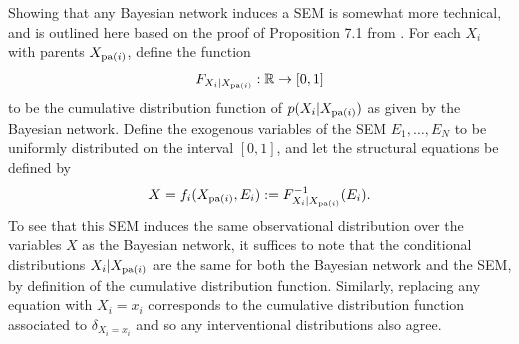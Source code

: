 Showing that any Bayesian network induces a SEM is somewhat more technical, and is outlined here based on the proof of Proposition 7.1 from \cite{peters2017elements}. 
For each $X_i$ with parents $X_{\operatorname{pa}(i)}$, define the function
%
\begin{align*}
F_{X_i|X_{\operatorname{pa}(i)}}:\mathbb{R} \to [0,1]
\end{align*}
%
to be the cumulative distribution function of $p(X_i|X_{\operatorname{pa}(i)})$ as given by the Bayesian network.
Define the exogenous variables of the SEM $E_1, \ldots, E_N$ to be uniformly distributed on the interval $[0,1]$, and let the structural equations be defined by
%
\begin{align*}
X = f_i(X_{\operatorname{pa}(i)}, E_i) := F^{-1}_{X_i|X_{\operatorname{pa}(i)}}(E_i).
\end{align*}
%
To see that this SEM induces the same observational distribution over the variables $X$ as the Bayesian network, it suffices to note that the conditional distributions $X_i|X_{\operatorname{pa}(i)}$ are the same for both the Bayesian network and the SEM, by definition of the cumulative distribution function.
Similarly, replacing any equation with $X_i=x_i$ corresponds to the cumulative distribution function associated to $\delta_{X_i=x_i}$ and so any interventional distributions also agree.




